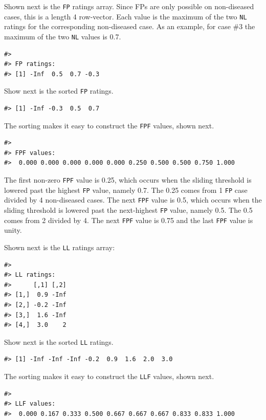 \documentclass[
]{book}
\begin{document}
Shown next is the \texttt{FP} ratings array. Since FPs are only possible on non-diseased cases, this is a length 4 row-vector. Each value is the maximum of the two \texttt{NL} ratings for the corresponding non-diseased case. As an example, for case \#3 the maximum of the two \texttt{NL} values is 0.7.

\begin{verbatim}
#> 
#> FP ratings:
#> [1] -Inf  0.5  0.7 -0.3
\end{verbatim}

Show next is the sorted \texttt{FP} ratings.

\begin{verbatim}
#> [1] -Inf -0.3  0.5  0.7
\end{verbatim}

The sorting makes it easy to construct the \texttt{FPF} values, shown next.

\begin{verbatim}
#> 
#> FPF values:
#>  0.000 0.000 0.000 0.000 0.000 0.250 0.500 0.500 0.750 1.000
\end{verbatim}

The first non-zero \texttt{FPF} value is 0.25, which occurs when the sliding threshold is lowered past the highest \texttt{FP} value, namely 0.7. The 0.25 comes from 1 \texttt{FP} case divided by 4 non-diseased cases. The next \texttt{FPF} value is 0.5, which occurs when the sliding threshold is lowered past the next-highest \texttt{FP} value, namely 0.5. The 0.5 comes from 2 divided by 4. The next \texttt{FPF} value is 0.75 and the last \texttt{FPF} value is unity.

Shown next is the \texttt{LL} ratings array:

\begin{verbatim}
#> 
#> LL ratings:
#>      [,1] [,2]
#> [1,]  0.9 -Inf
#> [2,] -0.2 -Inf
#> [3,]  1.6 -Inf
#> [4,]  3.0    2
\end{verbatim}

Show next is the sorted \texttt{LL} ratings.

\begin{verbatim}
#> [1] -Inf -Inf -Inf -0.2  0.9  1.6  2.0  3.0
\end{verbatim}

The sorting makes it easy to construct the \texttt{LLF} values, shown next.

\begin{verbatim}
#> 
#> LLF values:
#>  0.000 0.167 0.333 0.500 0.667 0.667 0.667 0.833 0.833 1.000
\end{verbatim}
\end{document}

